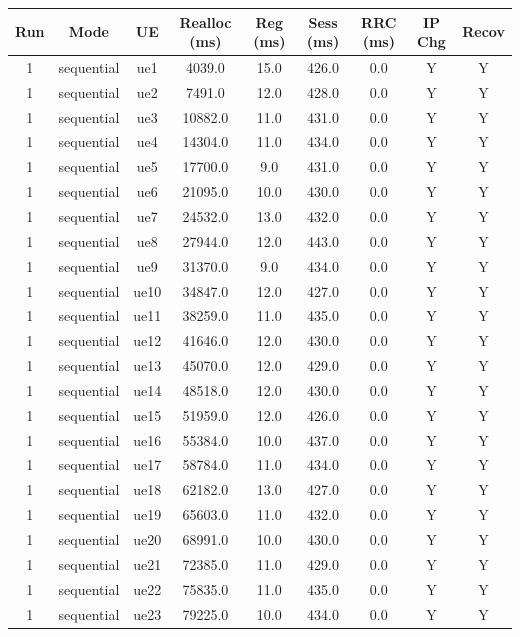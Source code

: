 \begin{table}[ht]
\centering
\begin{tabular}{|c|c|c|c|c|c|c|c|c|}
\hline
Run & Mode & UE & Realloc (ms) & Reg (ms) & Sess (ms) & RRC (ms) & IP Chg & Recov \\
\hline
1 & sequential & ue1 & 4039.0 & 15.0 & 426.0 & 0.0 & Y & Y \\
1 & sequential & ue2 & 7491.0 & 12.0 & 428.0 & 0.0 & Y & Y \\
1 & sequential & ue3 & 10882.0 & 11.0 & 431.0 & 0.0 & Y & Y \\
1 & sequential & ue4 & 14304.0 & 11.0 & 434.0 & 0.0 & Y & Y \\
1 & sequential & ue5 & 17700.0 & 9.0 & 431.0 & 0.0 & Y & Y \\
1 & sequential & ue6 & 21095.0 & 10.0 & 430.0 & 0.0 & Y & Y \\
1 & sequential & ue7 & 24532.0 & 13.0 & 432.0 & 0.0 & Y & Y \\
1 & sequential & ue8 & 27944.0 & 12.0 & 443.0 & 0.0 & Y & Y \\
1 & sequential & ue9 & 31370.0 & 9.0 & 434.0 & 0.0 & Y & Y \\
1 & sequential & ue10 & 34847.0 & 12.0 & 427.0 & 0.0 & Y & Y \\
1 & sequential & ue11 & 38259.0 & 11.0 & 435.0 & 0.0 & Y & Y \\
1 & sequential & ue12 & 41646.0 & 12.0 & 430.0 & 0.0 & Y & Y \\
1 & sequential & ue13 & 45070.0 & 12.0 & 429.0 & 0.0 & Y & Y \\
1 & sequential & ue14 & 48518.0 & 12.0 & 430.0 & 0.0 & Y & Y \\
1 & sequential & ue15 & 51959.0 & 12.0 & 426.0 & 0.0 & Y & Y \\
1 & sequential & ue16 & 55384.0 & 10.0 & 437.0 & 0.0 & Y & Y \\
1 & sequential & ue17 & 58784.0 & 11.0 & 434.0 & 0.0 & Y & Y \\
1 & sequential & ue18 & 62182.0 & 13.0 & 427.0 & 0.0 & Y & Y \\
1 & sequential & ue19 & 65603.0 & 11.0 & 432.0 & 0.0 & Y & Y \\
1 & sequential & ue20 & 68991.0 & 10.0 & 430.0 & 0.0 & Y & Y \\
1 & sequential & ue21 & 72385.0 & 11.0 & 429.0 & 0.0 & Y & Y \\
1 & sequential & ue22 & 75835.0 & 11.0 & 435.0 & 0.0 & Y & Y \\
1 & sequential & ue23 & 79225.0 & 10.0 & 434.0 & 0.0 & Y & Y \\

\end{tabular}
\end{table}

